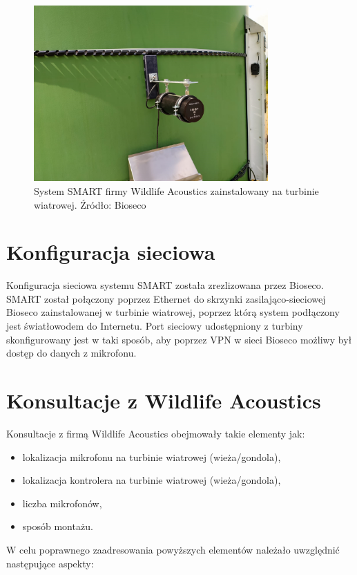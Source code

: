 \documentclass{sprz}
\begin{document}
\begin{figure}[h]
  \centering
  \includegraphics[width=0.8\textwidth]{sprz/smart-installed.png}
  \caption{System SMART firmy Wildlife Acoustics zainstalowany na turbinie wiatrowej. Źródło: Bioseco}
  \label{img:smart-installed}
\end{figure} 

\section{Konfiguracja sieciowa}
Konfiguracja sieciowa systemu SMART została zrezlizowana przez Bioseco. SMART został połączony poprzez Ethernet do skrzynki zasilająco-sieciowej Bioseco zainstalowanej w turbinie wiatrowej, poprzez którą system podłączony jest światłowodem do Internetu. Port sieciowy udostępniony z turbiny skonfigurowany jest w taki sposób, aby poprzez VPN w sieci Bioseco możliwy był dostęp do danych z mikrofonu.

\section{Konsultacje z Wildlife Acoustics}
Konsultacje z firmą Wildlife Acoustics obejmowały takie elementy jak:
\begin{itemize}
  \item{lokalizacja mikrofonu na turbinie wiatrowej (wieża/gondola),}
  \item{lokalizacja kontrolera na turbinie wiatrowej (wieża/gondola),}
  \item{liczba mikrofonów,}
  \item{sposób montażu.}
\end{itemize}

W celu poprawnego zaadresowania powyższych elementów należało uwzględnić następujące aspekty:
\end{document}
